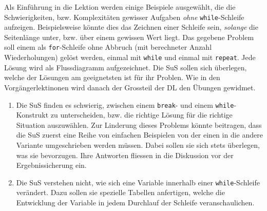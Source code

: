 \begin{myExBox}[title=DL \themycounter]
Als Einführung in die Lektion werden einige Beispiele ausgewählt, die die Schwierigkeiten, bzw. Komplexitäten gewisser Aufgaben \textit{ohne} \lstinline|while|-Schleife aufzeigen. Beispielsweise könnte dies das Zeichnen einer Schleife sein, \textit{solange} die Seitenlänge unter, bzw. über einem gewissen Wert liegt. Das gegebene Problem soll einem als \lstinline|for|-Schleife ohne Abbruch (mit berechneter Anzahl Wiederholungen) gelöst werden, einmal mit \lstinline|while| und einmal mit \lstinline|repeat|. Jede Lösung wird als Flussdiagramm aufgezeichnet. Die SuS sollen sich überlegen, welche der Lösungen am geeignetsten ist für ihr Problen. Wie in den Vorgängerlektinonen wird danach der Grossteil der DL den Übungen gewidmet.

\begin{myExBox}[title=Mögliche Schwierigkeiten \& geeignete Massnahmen]
\begin{enumerate}
    \item Die SuS finden es schwierig, zwischen einem \lstinline|break|- und einem \lstinline|while|-Konstrukt zu unterscheiden, bzw. die richtige Lösung für die richtige Situation auszuwählen. Zur Linderung dieses Problems könnte beitragen, dass die SuS zuerst eine Reihe von einfachen Beispielen von der einen in die andere Variante umgeschrieben werden müssen. Dabei sollen sie sich stets überlegen, was sie bevorzugen. Ihre Antworten fliessen in die Diskussion vor der Ergebnissicherung ein.
    \item Die SuS verstehen nicht, wie sich eine Variable innerhalb einer \lstinline|while|-Schleife verändert. Dazu sollen sie spezielle Tabellen anfertigen, welche die Entwicklung der Variable in jedem Durchlauf der Schleife veranschaulichen.
\end{enumerate}
\end{myExBox}
\end{myExBox}
\newpage{}

